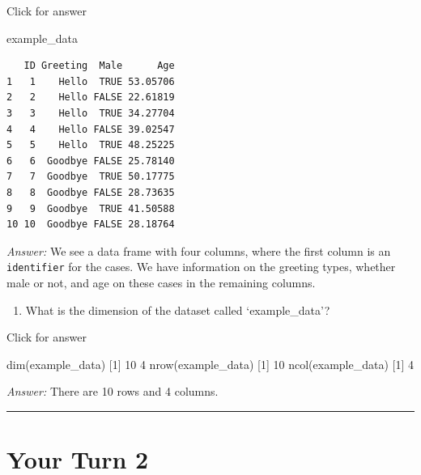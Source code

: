 \documentclass[
]{book}
\newenvironment{Shaded}{\begin{snugshade}}{\end{snugshade}}
\newcommand{\DecValTok}[1]{\textcolor[rgb]{0.00,0.00,0.81}{#1}}
\newcommand{\FunctionTok}[1]{\textcolor[rgb]{0.00,0.00,0.00}{#1}}
\newcommand{\NormalTok}[1]{#1}
\providecommand{\tightlist}{%
  \setlength{\itemsep}{0pt}\setlength{\parskip}{0pt}}
\begin{document}
Click for answer

\begin{Shaded}
\begin{Highlighting}[]
\NormalTok{example\_data}
\end{Highlighting}
\end{Shaded}

\begin{verbatim}
   ID Greeting  Male      Age
1   1    Hello  TRUE 53.05706
2   2    Hello FALSE 22.61819
3   3    Hello  TRUE 34.27704
4   4    Hello FALSE 39.02547
5   5    Hello  TRUE 48.25225
6   6  Goodbye FALSE 25.78140
7   7  Goodbye  TRUE 50.17775
8   8  Goodbye FALSE 28.73635
9   9  Goodbye  TRUE 41.50588
10 10  Goodbye FALSE 28.18764
\end{verbatim}

\emph{Answer:} We see a data frame with four columns, where the first column is an \texttt{identifier} for the cases. We have information on the greeting types, whether male or not, and age on these cases in the remaining columns.

\begin{enumerate}
\def\labelenumi{\alph{enumi}.}
\setcounter{enumi}{1}
\tightlist
\item
  What is the dimension of the dataset called `example\_data'?
\end{enumerate}

Click for answer

\begin{Shaded}
\begin{Highlighting}[]
\FunctionTok{dim}\NormalTok{(example\_data)}
\NormalTok{[}\DecValTok{1}\NormalTok{] }\DecValTok{10}  \DecValTok{4}
\FunctionTok{nrow}\NormalTok{(example\_data)}
\NormalTok{[}\DecValTok{1}\NormalTok{] }\DecValTok{10}
\FunctionTok{ncol}\NormalTok{(example\_data)}
\NormalTok{[}\DecValTok{1}\NormalTok{] }\DecValTok{4}
\end{Highlighting}
\end{Shaded}

\emph{Answer:} There are 10 rows and 4 columns.

\begin{center}\rule{0.5\linewidth}{0.5pt}\end{center}

\hypertarget{your-turn-2}{%
\section{Your Turn 2}\label{your-turn-2}}
\end{document}
